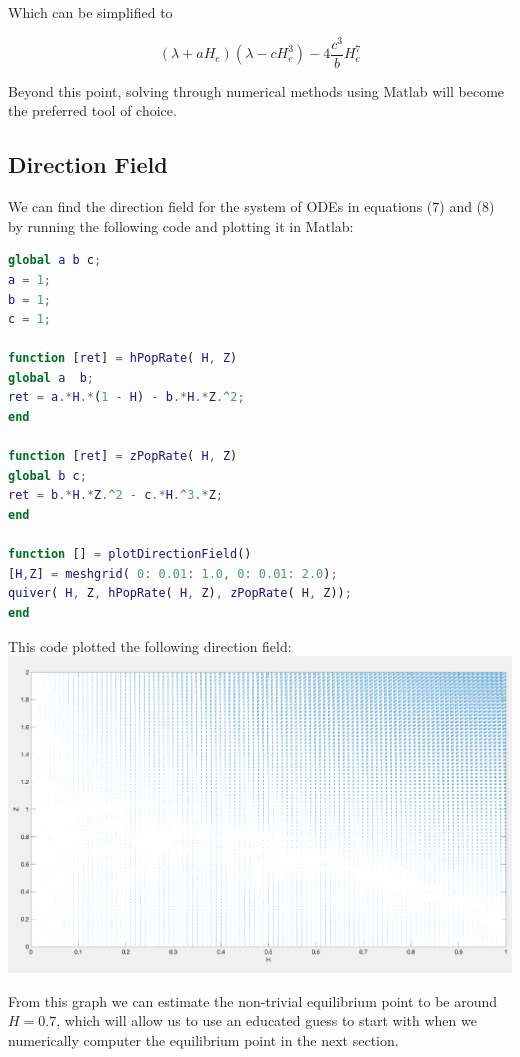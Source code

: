 \documentclass[11pt]{article}
\begin{document}
Which can be simplified to

\begin{equation}
(\lambda + a H_e) (\lambda - c H_e^3 ) - 4 \frac{c^3}{b} H_e^7
\end{equation}

Beyond this point, solving through numerical methods using Matlab will become the preferred tool of choice.

\subsection{ Direction Field}
We can find the direction field for the system of ODEs in equations (7) and (8) by running the following code and plotting it in Matlab:

\begin{lstlisting}[language = Matlab]
global a b c;
a = 1;
b = 1;
c = 1;

function [ret] = hPopRate( H, Z) 
global a  b;
ret = a.*H.*(1 - H) - b.*H.*Z.^2;
end

function [ret] = zPopRate( H, Z)
global b c;
ret = b.*H.*Z.^2 - c.*H.^3.*Z;
end

function [] = plotDirectionField()
[H,Z] = meshgrid( 0: 0.01: 1.0, 0: 0.01: 2.0);
quiver( H, Z, hPopRate( H, Z), zPopRate( H, Z));
end
\end{lstlisting}

This code plotted the following direction field:\\
\includegraphics[scale = 0.32]{Q5.png}

From this graph we can estimate the non-trivial equilibrium point to be around $H = 0.7$, which will allow us to use an educated guess to start with when we numerically computer the equilibrium point in the next section.
\end{document}
